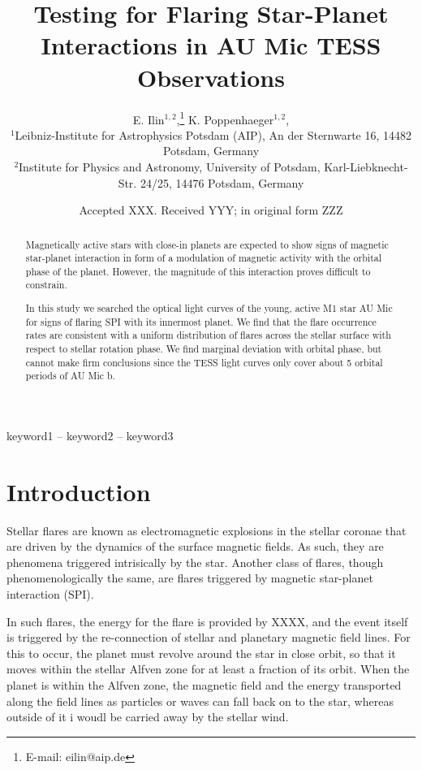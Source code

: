\documentclass[fleqn,usenatbib,letters]{mnras}%
\title[]{Testing for Flaring Star-Planet Interactions in AU Mic TESS Observations}
\author[E. Ilin et al.]{
E. Ilin$^{1,2}$,\thanks{E-mail: eilin@aip.de}
K. Poppenhaeger$^{1,2}$,
\\
$^{1}$Leibniz-Institute for Astrophysics Potsdam (AIP), An der Sternwarte 16, 14482 Potsdam, Germany\\
$^{2}$Institute for Physics and Astronomy, University of Potsdam, Karl-Liebknecht-Str. 24/25, 14476 Potsdam, Germany
}
\date{Accepted XXX. Received YYY; in original form ZZZ}
\begin{document}
\label{firstpage}
\pagerange{\pageref{firstpage}--\pageref{lastpage}}
\maketitle

\begin{abstract}
Magnetically active stars with close-in planets are expected to show signs of magnetic star-planet interaction in form of a modulation of magnetic activity with the orbital phase of the planet. However, the magnitude of this interaction proves difficult to constrain.

In this study we searched the optical light curves of the young, active M1 star AU Mic for signs of flaring SPI with its innermost planet. We find that the flare occurrence rates are consistent with a uniform distribution of flares across the stellar surface with respect to stellar rotation phase. We find marginal deviation with orbital phase, but cannot make firm conclusions since the TESS light curves only cover about 5 orbital periods of AU Mic b. 
\end{abstract}

\begin{keywords}
keyword1 -- keyword2 -- keyword3
\end{keywords}

%

\section{Introduction}

Stellar flares are known as electromagnetic explosions in the stellar coronae that are driven by the dynamics of the surface magnetic fields. As such, they are phenomena triggered intrisically by the star. Another class of flares, though phenomenologically the same, are flares triggered by magnetic star-planet interaction (SPI).

In such flares, the energy for the flare is provided by XXXX, and the event itself is triggered by the re-connection of stellar and planetary magnetic field lines. For this to occur, the planet must revolve around the star in close orbit, so that it moves within the stellar Alfven zone for at least a fraction of its orbit. When the planet is within the Alfven zone, the magnetic field and the energy transported along the field lines as particles or waves can fall back on to the star, whereas outside of it i woudl be carried away by the stellar wind. 
\end{document}
